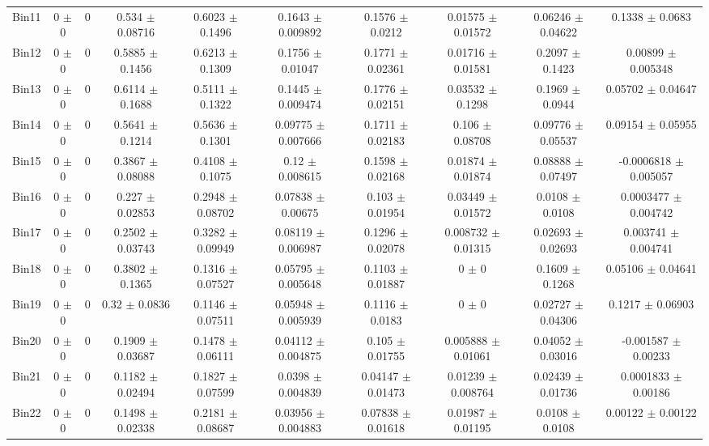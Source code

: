 \begin{tabular}{@{\extracolsep{4pt}}lccccccccc@{}}
     Bin11 & 0 $\pm$ 0 & 0 & 0.534 $\pm$ 0.08716 & 0.6023 $\pm$ 0.1496 & 0.1643 $\pm$ 0.009892 & 0.1576 $\pm$ 0.0212 & 0.01575 $\pm$ 0.01572 & 0.06246 $\pm$ 0.04622 & 0.1338 $\pm$ 0.0683 \\ 
     Bin12 & 0 $\pm$ 0 & 0 & 0.5885 $\pm$ 0.1456 & 0.6213 $\pm$ 0.1309 & 0.1756 $\pm$ 0.01047 & 0.1771 $\pm$ 0.02361 & 0.01716 $\pm$ 0.01581 & 0.2097 $\pm$ 0.1423 & 0.00899 $\pm$ 0.005348 \\ 
     Bin13 & 0 $\pm$ 0 & 0 & 0.6114 $\pm$ 0.1688 & 0.5111 $\pm$ 0.1322 & 0.1445 $\pm$ 0.009474 & 0.1776 $\pm$ 0.02151 & 0.03532 $\pm$ 0.1298 & 0.1969 $\pm$ 0.0944 & 0.05702 $\pm$ 0.04647 \\ 
     Bin14 & 0 $\pm$ 0 & 0 & 0.5641 $\pm$ 0.1214 & 0.5636 $\pm$ 0.1301 & 0.09775 $\pm$ 0.007666 & 0.1711 $\pm$ 0.02183 & 0.106 $\pm$ 0.08708 & 0.09776 $\pm$ 0.05537 & 0.09154 $\pm$ 0.05955 \\ 
     Bin15 & 0 $\pm$ 0 & 0 & 0.3867 $\pm$ 0.08088 & 0.4108 $\pm$ 0.1075 & 0.12 $\pm$ 0.008615 & 0.1598 $\pm$ 0.02168 & 0.01874 $\pm$ 0.01874 & 0.08888 $\pm$ 0.07497 & -0.0006818 $\pm$ 0.005057 \\ 
     Bin16 & 0 $\pm$ 0 & 0 & 0.227 $\pm$ 0.02853 & 0.2948 $\pm$ 0.08702 & 0.07838 $\pm$ 0.00675 & 0.103 $\pm$ 0.01954 & 0.03449 $\pm$ 0.01572 & 0.0108 $\pm$ 0.0108 & 0.0003477 $\pm$ 0.004742 \\ 
     Bin17 & 0 $\pm$ 0 & 0 & 0.2502 $\pm$ 0.03743 & 0.3282 $\pm$ 0.09949 & 0.08119 $\pm$ 0.006987 & 0.1296 $\pm$ 0.02078 & 0.008732 $\pm$ 0.01315 & 0.02693 $\pm$ 0.02693 & 0.003741 $\pm$ 0.004741 \\ 
     Bin18 & 0 $\pm$ 0 & 0 & 0.3802 $\pm$ 0.1365 & 0.1316 $\pm$ 0.07527 & 0.05795 $\pm$ 0.005648 & 0.1103 $\pm$ 0.01887 & 0 $\pm$ 0 & 0.1609 $\pm$ 0.1268 & 0.05106 $\pm$ 0.04641 \\ 
     Bin19 & 0 $\pm$ 0 & 0 & 0.32 $\pm$ 0.0836 & 0.1146 $\pm$ 0.07511 & 0.05948 $\pm$ 0.005939 & 0.1116 $\pm$ 0.0183 & 0 $\pm$ 0 & 0.02727 $\pm$ 0.04306 & 0.1217 $\pm$ 0.06903 \\ 
     Bin20 & 0 $\pm$ 0 & 0 & 0.1909 $\pm$ 0.03687 & 0.1478 $\pm$ 0.06111 & 0.04112 $\pm$ 0.004875 & 0.105 $\pm$ 0.01755 & 0.005888 $\pm$ 0.01061 & 0.04052 $\pm$ 0.03016 & -0.001587 $\pm$ 0.00233 \\ 
     Bin21 & 0 $\pm$ 0 & 0 & 0.1182 $\pm$ 0.02494 & 0.1827 $\pm$ 0.07599 & 0.0398 $\pm$ 0.004839 & 0.04147 $\pm$ 0.01473 & 0.01239 $\pm$ 0.008764 & 0.02439 $\pm$ 0.01736 & 0.0001833 $\pm$ 0.00186 \\ 
     Bin22 & 0 $\pm$ 0 & 0 & 0.1498 $\pm$ 0.02338 & 0.2181 $\pm$ 0.08687 & 0.03956 $\pm$ 0.004883 & 0.07838 $\pm$ 0.01618 & 0.01987 $\pm$ 0.01195 & 0.0108 $\pm$ 0.0108 & 0.00122 $\pm$ 0.00122 \\ 

\end{tabular}
